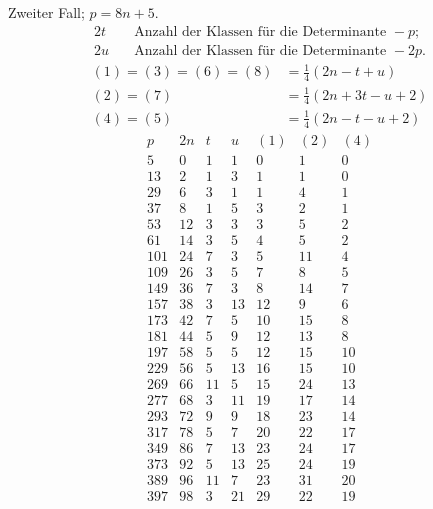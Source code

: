 \clearpage
Zweiter Fall; $p=8n+5$.
\[
\begin{aligned}
2t&\quad\text{Anzahl der Klassen für die Determinante }-p;\\
2u&\quad\text{Anzahl der Klassen für die Determinante }-2p.
\end{aligned}
\]
\[
\begin{aligned}
(1)=(3)=(6)=(8)&=\tfrac14(2n-t+u)\\
(2)=(7)&=\tfrac14(2n+3t-u+2)\\
(4)=(5)&=\tfrac14(2n-t-u+2)
\end{aligned}
\]
\[
\begin{array}{r|r|r|r|r|r|r}
p&2n&t&u&(1)&(2)&(4)\\\hline
5&0&1&1&0&1&0\\
13&2&1&3&1&1&0\\
29&6&3&1&1&4&1\\
37&8&1&5&3&2&1\\
53&12&3&3&3&5&2\\
61&14&3&5&4&5&2\\
101&24&7&3&5&11&4\\
109&26&3&5&7&8&5\\
149&36&7&3&8&14&7\\
157&38&3&13&12&9&6\\
173&42&7&5&10&15&8\\
181&44&5&9&12&13&8\\
197&58&5&5&12&15&10\\
229&56&5&13&16&15&10\\
269&66&11&5&15&24&13\\
277&68&3&11&19&17&14\\
293&72&9&9&18&23&14\\
317&78&5&7&20&22&17\\
349&86&7&13&23&24&17\\
373&92&5&13&25&24&19\\
389&96&11&7&23&31&20\\
397&98&3&21&29&22&19
\end{array}
\]

